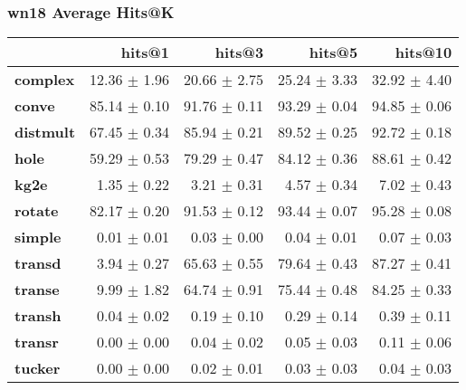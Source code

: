 \documentclass{article}
\begin{document}
\subsubsection{wn18 Average Hits@K}
    \begin{center}
    \begin{tabular}{lrrrr}
\toprule
{} &        hits@1 &        hits@3 &        hits@5 &       hits@10 \\
\midrule
\textbf{complex } &  12.36 $\pm$ 1.96 &  20.66 $\pm$ 2.75 &  25.24 $\pm$ 3.33 &  32.92 $\pm$ 4.40 \\
\textbf{conve   } &  85.14 $\pm$ 0.10 &  91.76 $\pm$ 0.11 &  93.29 $\pm$ 0.04 &  94.85 $\pm$ 0.06 \\
\textbf{distmult} &  67.45 $\pm$ 0.34 &  85.94 $\pm$ 0.21 &  89.52 $\pm$ 0.25 &  92.72 $\pm$ 0.18 \\
\textbf{hole    } &  59.29 $\pm$ 0.53 &  79.29 $\pm$ 0.47 &  84.12 $\pm$ 0.36 &  88.61 $\pm$ 0.42 \\
\textbf{kg2e    } &   1.35 $\pm$ 0.22 &   3.21 $\pm$ 0.31 &   4.57 $\pm$ 0.34 &   7.02 $\pm$ 0.43 \\
\textbf{rotate  } &  82.17 $\pm$ 0.20 &  91.53 $\pm$ 0.12 &  93.44 $\pm$ 0.07 &  95.28 $\pm$ 0.08 \\
\textbf{simple  } &   0.01 $\pm$ 0.01 &   0.03 $\pm$ 0.00 &   0.04 $\pm$ 0.01 &   0.07 $\pm$ 0.03 \\
\textbf{transd  } &   3.94 $\pm$ 0.27 &  65.63 $\pm$ 0.55 &  79.64 $\pm$ 0.43 &  87.27 $\pm$ 0.41 \\
\textbf{transe  } &   9.99 $\pm$ 1.82 &  64.74 $\pm$ 0.91 &  75.44 $\pm$ 0.48 &  84.25 $\pm$ 0.33 \\
\textbf{transh  } &   0.04 $\pm$ 0.02 &   0.19 $\pm$ 0.10 &   0.29 $\pm$ 0.14 &   0.39 $\pm$ 0.11 \\
\textbf{transr  } &   0.00 $\pm$ 0.00 &   0.04 $\pm$ 0.02 &   0.05 $\pm$ 0.03 &   0.11 $\pm$ 0.06 \\
\textbf{tucker  } &   0.00 $\pm$ 0.00 &   0.02 $\pm$ 0.01 &   0.03 $\pm$ 0.03 &   0.04 $\pm$ 0.03 \\
\bottomrule
\end{tabular}

    \end{center}
\end{document}
